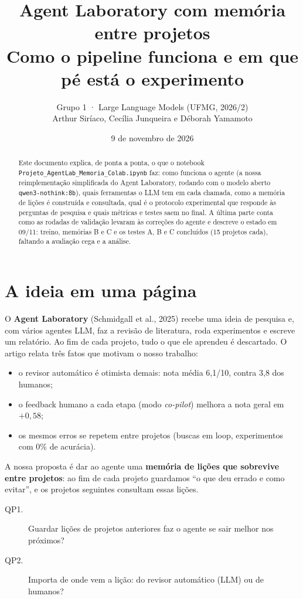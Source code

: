 \documentclass[11pt,a4paper]{article}
\title{Agent Laboratory com memória entre projetos\\[2pt]
       \large Como o pipeline funciona e em que pé está o experimento}
\author{Grupo 1 · Large Language Models (UFMG, 2026/2)\\
        Arthur Siríaco, Cecília Junqueira e Déborah Yamamoto}
\date{9 de novembro de 2026}
\begin{document}
\maketitle

\begin{abstract}
Este documento explica, de ponta a ponta, o que o notebook
\texttt{Projeto\_AgentLab\_Memoria\_Colab.ipynb} faz: como funciona o agente (a nossa
reimplementação simplificada do Agent Laboratory, rodando com o modelo aberto
\texttt{qwen3-nothink:8b}), quais ferramentas o LLM tem em cada chamada, como a memória de
lições é construída e consultada, qual é o protocolo experimental que responde às perguntas de
pesquisa e quais métricas e testes saem no final. A última parte conta como as rodadas de
validação levaram às correções do agente e descreve o estado em 09/11: treino, memórias B e C e
os testes A, B e C concluídos (15 projetos cada), faltando a avaliação cega e a análise.
\end{abstract}

\tableofcontents

\section{A ideia em uma página}

O \textbf{Agent Laboratory} (Schmidgall et al., 2025) recebe uma ideia de pesquisa e, com
vários agentes LLM, faz a revisão de literatura, roda experimentos e escreve um relatório.
Ao fim de cada projeto, tudo o que ele aprendeu é descartado. O artigo relata três fatos que
motivam o nosso trabalho:

\begin{itemize}
  \item o revisor automático é otimista demais: nota média 6,1/10, contra 3,8 dos humanos;
  \item o feedback humano a cada etapa (modo \emph{co-pilot}) melhora a nota geral em $+0{,}58$;
  \item os mesmos erros se repetem entre projetos (buscas em loop, experimentos com 0\% de acurácia).
\end{itemize}

A nossa proposta é dar ao agente uma \textbf{memória de lições que sobrevive entre projetos}:
ao fim de cada projeto guardamos ``o que deu errado e como evitar'', e os projetos seguintes
consultam essas lições.

\begin{description}
  \item[QP1.] Guardar lições de projetos anteriores faz o agente se sair melhor nos próximos?
  \item[QP2.] Importa de onde vem a lição: do revisor automático (LLM) ou de humanos?
\end{description}
\end{document}
